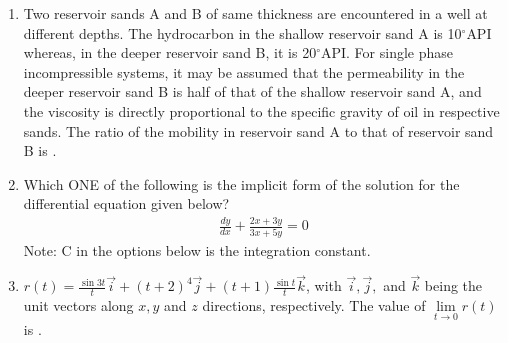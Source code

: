 \documentclass[journal,12pt,onecolumn]{IEEEtran}
\theoremstyle{remark}
\begin{document}
\begin{enumerate}
 \item Two reservoir sands A and B of same thickness are encountered in a well at different depths. The hydrocarbon in the shallow reservoir sand A is 10$^\circ$API whereas, in the deeper reservoir sand B, it is 20$^\circ$API. For single phase incompressible systems, it may be assumed that the permeability in the deeper reservoir sand B is half of that of the shallow reservoir sand A, and the viscosity is directly proportional to the specific gravity of oil in respective sands. The ratio of the mobility in reservoir sand A to that of reservoir sand B is \underline{\hspace{1cm}} .
\begin{enumerate}
\end{enumerate}
\hfill{}
\item  Which ONE of the following is the implicit form of the solution for the differential equation given below?
\begin{align}
 \frac{dy}{dx} + \frac{2x+3y}{3x+5y} = 0  
\end{align}
Note: C in the options below is the integration constant.
\begin{enumerate}
\end{enumerate}
\hfill{}



\item $r(t) = \frac{\sin 3t}{t} \vec{i} + (t + 2)^4 \vec{j} + (t + 1)\frac{\sin t}{t} \vec{k}$, with $\vec{i}, \vec{j},$ and $\vec{k}$ being the unit vectors along $x, y$ and $z$ directions, respectively. The value of $\lim\limits_{t \to 0} r(t)$ is \underline{\hspace{1cm}}.
\begin{enumerate}
\end{enumerate}
\hfill{}




\end{enumerate}
\end{document}
